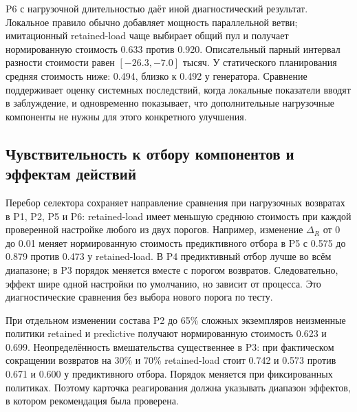 P6 с нагрузочной длительностью даёт иной диагностический результат. Локальное правило обычно добавляет мощность параллельной ветви; имитационный retained-load чаще выбирает общий пул и получает нормированную стоимость 0.633 против 0.920. Описательный парный интервал разности стоимости равен $[-26.3,-7.0]$ тысяч. У статического планирования средняя стоимость ниже: 0.494, близко к 0.492 у генератора. Сравнение поддерживает оценку системных последствий, когда локальные показатели вводят в заблуждение, и одновременно показывает, что дополнительные нагрузочные компоненты не нужны для этого конкретного улучшения.

\subsection{Чувствительность к отбору компонентов и эффектам действий}
Перебор селектора сохраняет направление сравнения при нагрузочных возвратах в P1, P2, P5 и P6: retained-load имеет меньшую среднюю стоимость при каждой проверенной настройке любого из двух порогов. Например, изменение $\Delta_R$ от 0 до 0.01 меняет нормированную стоимость предиктивного отбора в P5 с 0.575 до 0.879 против 0.473 у retained-load. В P4 предиктивный отбор лучше во всём диапазоне; в P3 порядок меняется вместе с порогом возвратов. Следовательно, эффект шире одной настройки по умолчанию, но зависит от процесса. Это диагностические сравнения без выбора нового порога по тесту.

При отдельном изменении состава P2 до 65\% сложных экземпляров неизменные политики retained и predictive получают нормированную стоимость 0.623 и 0.699. Неопределённость вмешательства существеннее в P3: при фактическом сокращении возвратов на 30\% и 70\% retained-load стоит 0.742 и 0.573 против 0.671 и 0.600 у предиктивного отбора. Порядок меняется при фиксированных политиках. Поэтому карточка реагирования должна указывать диапазон эффектов, в котором рекомендация была проверена.
